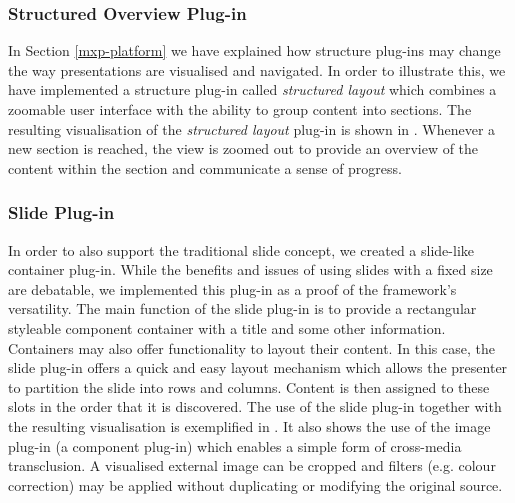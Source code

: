     \subsubsection{Structured Overview Plug-in}

     In Section \ref{mxp-platform} we have explained how structure plug-ins may
     change the way presentations are visualised and navigated. In order to
     illustrate this, we have implemented a structure plug-in called
     \emph{structured layout} which combines a zoomable user interface with the
     ability to group content into sections. The resulting visualisation of the
     \emph{structured layout} plug-in is shown in .
     Whenever a new section is reached, the view is zoomed out to provide an
     overview of the content within the section and communicate a sense of
     progress.

    \subsubsection{Slide Plug-in}

     In order to also support the traditional slide concept, we created a
     slide-like container plug-in. While the benefits and issues of using
     slides with a fixed size are debatable, we implemented this plug-in as a
     proof of the framework's versatility. The main function of the slide
     plug-in is to provide a rectangular styleable component container with a
     title and some other information. Containers may also offer functionality
     to layout their content. In this case, the slide plug-in offers a quick
     and easy layout mechanism which allows the presenter to partition the
     slide into rows and columns. Content is then assigned to these slots in
     the order that it is discovered. The use of the slide plug-in together
     with the resulting visualisation is exemplified in .
     It also shows the use of the image plug-in (a component plug-in) which
     enables a simple form of cross-media transclusion. A visualised external
     image can be cropped and filters (e.g. colour correction) may be applied
     without duplicating or modifying the original source.

